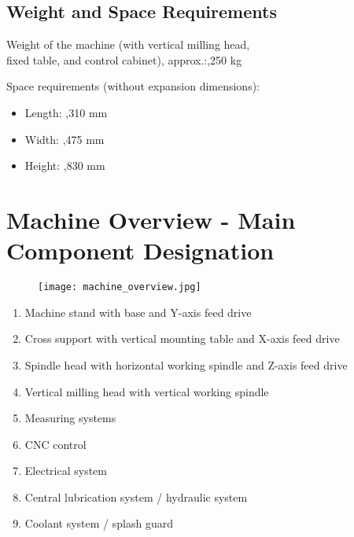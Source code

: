 
\subsection{Weight and Space Requirements}
Weight of the machine (with vertical milling head, \\
fixed table, and control cabinet), approx.:,250 kg

\vspace{0.5cm}
\noindent Space requirements (without expansion dimensions):
\begin{itemize}
    \item Length: ,310 mm
    \item Width: ,475 mm
    \item Height: ,830 mm
\end{itemize}

\section{Machine Overview - Main Component Designation}

\begin{figure}[h]
    \centering
    \texttt{[image: machine\_overview.jpg]}
    \caption{}
    \label{fig:machine_overview}
\end{figure}

\vspace{3cm}

\begin{enumerate}[itemsep=1pt,parsep=0pt]
    \item Machine stand with base and Y-axis feed drive
    \item Cross support with vertical mounting table and X-axis feed drive
    \item Spindle head with horizontal working spindle and Z-axis feed drive
    \item Vertical milling head with vertical working spindle
    \item Measuring systems
    \item CNC control
    \item Electrical system
    \item Central lubrication system / hydraulic system
    \item Coolant system / splash guard
\end{enumerate}

